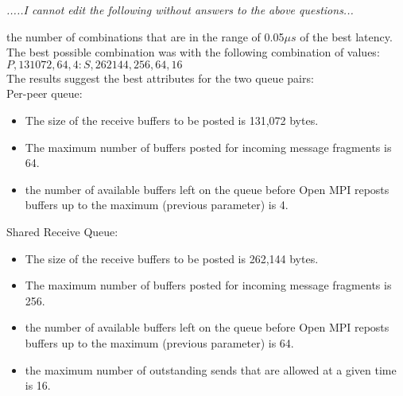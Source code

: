{\em .....I cannot edit the following without answers to the above
  questions...}

 the
number of combinations that are in the range of 0.05$\mu s$ of the
best latency. The best possible combination was with the following
combination of values:
$P,131072,64,4:S,262144,256,64,16$\\
The results suggest the best attributes for the two queue pairs:\\
Per-peer queue:
\begin{itemize}
\item The size of the receive buffers to be posted is 131,072 bytes.
\item The maximum number of buffers posted for incoming message
  fragments is 64.
\item the number of available buffers left on the queue before Open
  MPI reposts buffers up to the maximum (previous parameter) is 4.
\end{itemize}
Shared Receive Queue:
\begin{itemize}
\item The size of the receive buffers to be posted is 262,144 bytes.
\item The maximum number of buffers posted for incoming message
  fragments is 256.
\item the number of available buffers left on the queue before Open
  MPI reposts buffers up to the maximum (previous parameter) is 64.
\item the maximum number of outstanding sends that are allowed at a
  given time is 16.
\end{itemize}

